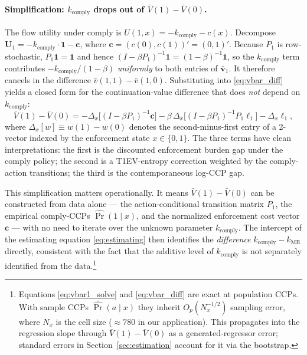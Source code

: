 \paragraph{Simplification: $k_{\text{comply}}$ drops out of $\bar V(1) - \bar V(0)$.}
The flow utility under comply is $U(1, x) = -k_{\text{comply}} - c(x)$.
Decompose $\boldsymbol{U}_1 = -k_{\text{comply}} \cdot \mathbf{1} -
\boldsymbol{c}$, where $\boldsymbol{c} = (c(0), c(1))' = (0, 1)'$. Because
$P_1$ is row-stochastic, $P_1 \mathbf{1} = \mathbf{1}$ and hence
$(I - \beta P_1)^{-1} \mathbf{1} = (1 - \beta)^{-1} \mathbf{1}$, so the
$k_{\text{comply}}$ term contributes $-k_{\text{comply}} / (1 - \beta)$
\emph{uniformly} to both entries of $\boldsymbol{\bar v}_1$. It therefore
cancels in the difference $\bar v(1, 1) - \bar v(1, 0)$. Substituting into
\eqref{eq:vbar_diff} yields a closed form for the continuation-value
difference that does \emph{not} depend on $k_{\text{comply}}$:
\begin{equation}
\bar V(1) - \bar V(0) =
- \Delta_x \!\big[(I - \beta P_1)^{-1} \boldsymbol{c}\big]
- \beta \, \Delta_x \!\big[(I - \beta P_1)^{-1} P_1 \boldsymbol{\ell}_1\big]
- \Delta_x \boldsymbol{\ell}_1,
\label{eq:vbar_diff_final}
\end{equation}
where $\Delta_x [w] \equiv w(1) - w(0)$ denotes the second-minus-first entry
of a 2-vector indexed by the enforcement state $x \in \{0, 1\}$. The three
terms have clean interpretations: the first is the discounted enforcement
burden gap under the comply policy; the second is a T1EV-entropy correction
weighted by the comply-action transitions; the third is the contemporaneous
log-CCP gap.

This simplification matters operationally. It means $\bar V(1) - \bar V(0)$
can be constructed from data alone — the action-conditional transition matrix
$P_1$, the empirical comply-CCPs $\hat\Pr(1 \mid x)$, and the normalized
enforcement cost vector $\boldsymbol{c}$ — with no need to iterate over the
unknown parameter $k_{\text{comply}}$. The
intercept of the estimating equation \eqref{eq:estimating} then identifies the
\emph{difference} $k_{\text{comply}} - k_{\text{MR}}$ directly, consistent with
the fact that the additive level of $k_{\text{comply}}$ is not separately
identified from the data.\footnote{Equations \eqref{eq:vbar1_solve} and \eqref{eq:vbar_diff}
are exact at population CCPs. With sample CCPs $\hat\Pr(a \mid x)$ they
inherit $O_p(N_x^{-1/2})$ sampling error, where $N_x$ is the cell size
($\approx 780$ in our application). This propagates into the regression
slope through $\bar V(1) - \bar V(0)$ as a generated-regressor error;
standard errors in Section~\ref{sec:estimation} account for it via the
bootstrap.}

